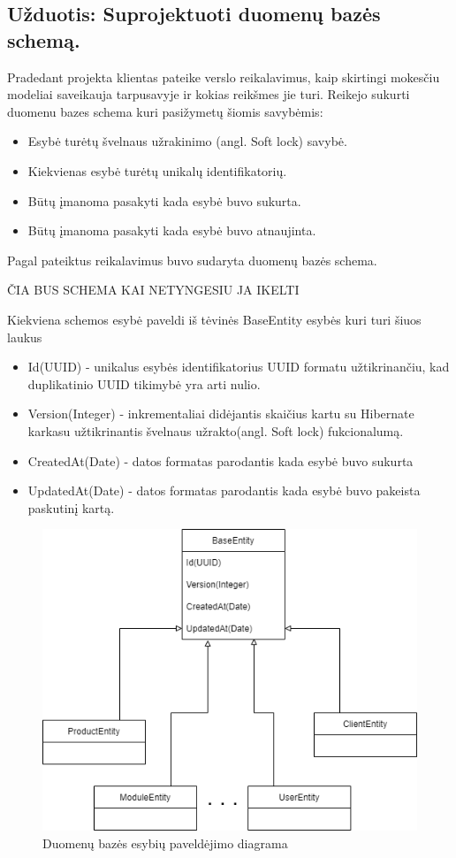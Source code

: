 \documentclass{VUMIFPSkursinis}
\begin{document}
	\subsection{Užduotis: Suprojektuoti duomenų bazės schemą.}
		Pradedant projekta klientas pateike verslo reikalavimus, kaip skirtingi mokesčiu modeliai saveikauja tarpusavyje ir kokias reikšmes jie turi.
		Reikejo sukurti duomenu bazes schema kuri pasižymetų šiomis savybėmis:
		\begin{itemize}
			\item{Esybė turėtų švelnaus užrakinimo (angl. Soft lock) savybė.}
			\item{Kiekvienas esybė turėtų unikalų identifikatorių.}
			\item{Būtų įmanoma pasakyti kada esybė buvo sukurta.}
			\item{Būtų įmanoma pasakyti kada esybė buvo atnaujinta.}
		\end{itemize}

		Pagal pateiktus reikalavimus buvo sudaryta duomenų bazės schema.

		ČIA BUS SCHEMA KAI NETYNGESIU JA IKELTI

		Kiekviena schemos esybė paveldi iš tėvinės BaseEntity esybės kuri turi šiuos laukus
		\begin{itemize}
			\item{Id(UUID) - unikalus esybės identifikatorius UUID formatu užtikrinančiu, kad duplikatinio UUID tikimybė yra arti nulio.}
			\item{Version(Integer) - inkrementaliai didėjantis skaičius kartu su Hibernate karkasu užtikrinantis švelnaus užrakto(angl. Soft lock) fukcionalumą.}
			\item{CreatedAt(Date) - datos formatas parodantis kada esybė buvo sukurta}
			\item{UpdatedAt(Date) - datos formatas parodantis kada esybė buvo pakeista paskutinį kartą.}
		\end{itemize}


		\begin{figure}[H]
			\includegraphics[scale=0.7]{img/eight}
			\caption{Duomenų bazės esybių paveldėjimo diagrama} %
			\label{img:kurimoProcesas}
		\end{figure}
\end{document}
